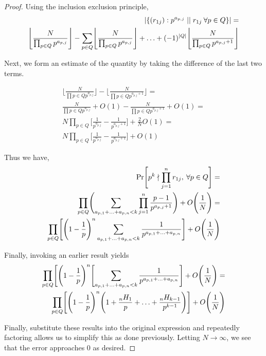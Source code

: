 \documentclass[12pt]{amsart}
\theoremstyle{definition}
\begin{document}
\begin{proof}
	Using the inclusion exclusion principle, 
	\begin{align*}
		|\{(r_{1j}): p^{a_{{p,j}}}\mid\mid r_{1j} \: \forall p\in Q\}| = \\
		\Biggl\lfloor\frac{N}{\prod_{p\in Q}p^{a_{p,j}}}\Biggr\rfloor-\sum_{p\in Q}\Biggl\lfloor \frac{N}{\prod_{p\in Q}p^{a_{p,j}}}\Biggr\rfloor+\mathellipsis+(-1)^{|Q|}\Biggl\lfloor\frac{N}{\prod_{p\in Q}p^{a_{p,j}+1}}\Biggr\rfloor
	\end{align*}
	
	Next, we form an estimate of the quantity by taking the difference of the last two terms. 
	
	\begin{align*}
		\Biggl\lfloor \frac{N}{\prod {p\in Q} p^{a_{p,j}}} \Biggr\rfloor - \Biggl\lfloor \frac{N}{\prod {p\in Q} p^{a_{p,j}+1}} \Biggr\rfloor =\\
		\frac{N}{\prod {p\in Q} p^{a_{p,j}}} + O(1) -  \frac{N}{\prod {p\in Q} p^{a_{p,j}+1}} + O(1) =\\
		N\prod_ {p\in Q}\Biggl[ \frac{1}{ p^{a_{p,j}}}  -  \frac{1}{ p^{a_{p,j}+1}} \Biggr]+ \frac{2}{N}O(1)=\\
		N\prod_ {p\in Q}\Biggl[ \frac{1}{ p^{a_{p,j}}}  -  \frac{1}{ p^{a_{p,j}+1}} \Biggr]+ O(1)
	\end{align*}
	
	Thus we have,
	\begin{align*}
		\Pr\Biggl[p^k\nmid \prod_{j=1}^{n}r_{1j},\: \forall p\in Q\Biggr] =\\
		\prod_{p\in Q} \Biggl(\sum_{a_{p,1}+\mathellipsis+a_{p,n}<k}\prod_{j=1}^{n}\frac{p-1}{p^{a_{p,j}+1}}\Biggr)+O\Biggl(\frac{1}{N}\Biggr) = \\
		\prod_{p\in Q}\Biggl[\Biggl(1-\frac{1}{p}\Biggr)^n\sum_{a_{p,1}+\mathellipsis+a_{p,n}<k}\frac{1}{p^{a_{p,1}+\mathellipsis+a_{p,n}}}\Biggr]+O\Biggl(\frac{1}{N}\Biggr)
	\end{align*}
	
	Finally, invoking an earlier result yields
	\begin{align*}
		\prod_{p\in Q}\Biggl[\Biggl(1-\frac{1}{p}\Biggr)^n\Biggl[\sum_{a_{p,1}+\mathellipsis+a_{p,n}<k}\frac{1}{p^{a_{p,1}+\mathellipsis+a_{p,n}}}\Biggr]+O\Biggl(\frac{1}{N}\Biggr)=\\
		\prod_{p\in Q}\Biggl[\Biggl(1-\frac{1}{p}\Biggr)^n\Biggl(1+\frac{_nH_1}{p}+\mathellipsis+\frac{_nH_{k-1}}{p^{k-1}}\Biggr)\Biggr]+O\Biggl(\frac{1}{N}\Biggr)
	\end{align*}
	
	Finally, substitute these results into the original expression and repeatedly factoring allows us to simplify this as done previously. Letting $N\to \infty$, we see that the error approaches 0 as desired. 
\end{proof}
\end{document}
